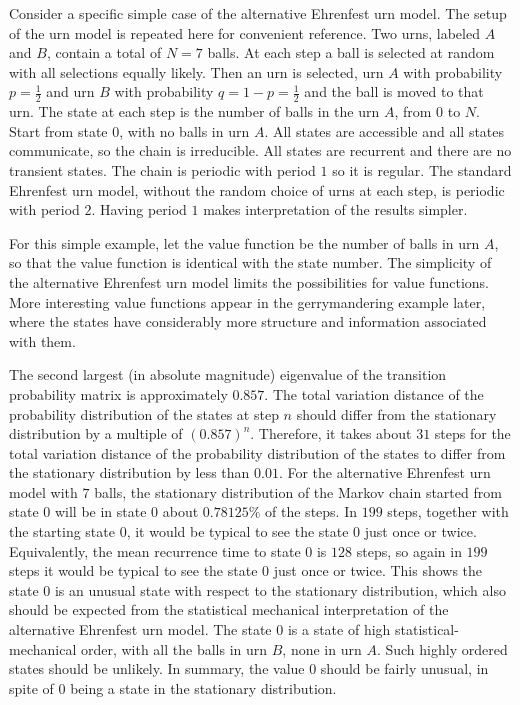 \documentclass[12pt]{article}
\begin{document}
\begin{example}
\begin{example}
    Consider a specific simple case of the alternative Ehrenfest urn
    model.%
    The setup of the urn model is repeated here for convenient reference.
    Two urns, labeled \( A \) and \( B \), contain a total of \( N = 7 \)
    balls.  At each step a ball is selected at random with all
    selections equally likely.  Then an urn is selected, urn \( A \)
    with probability \( p = \frac{1}{2} \) and urn \( B \) with
    probability \( q = 1-p = \frac {1}{2} \) and the ball is moved to
    that urn.  The state at each step is the number of balls in the urn \(
    A \), from \( 0 \) to \( N \).  Start from state \( 0 \), with no
    balls in urn \( A \).  All states are accessible and all states
    communicate, so the chain is irreducible.  All states are recurrent
    and there are no transient states.  The chain is periodic with
    period \( 1 \) so it is regular.  The standard Ehrenfest urn model,
    without the random choice of urns at each step, is periodic with
    period \( 2 \).  Having period \( 1 \) makes interpretation of the
    results simpler.

    For this simple example, let the value function be the number of
    balls in urn \( A \), so that the value function is identical with
    the state number.  The simplicity of the alternative Ehrenfest urn
    model limits the possibilities for value functions.  More
    interesting value functions appear in the gerrymandering example
    later, where the states have considerably more structure and
    information associated with them.

    The second largest (in absolute magnitude) eigenvalue of the
    transition probability matrix is approximately \( 0.857 \).  The
    total variation distance of the probability distribution of the
    states at step \( n \) should differ from the stationary
    distribution by a multiple of \( (0.857)^n \).  Therefore, it takes
    about \( 31 \) steps for the total variation distance of the
    probability distribution of the states to differ from the stationary
    distribution by less than \( 0.01 \).  For the alternative Ehrenfest
    urn model with \( 7 \) balls, the stationary distribution of the
    Markov chain started from state \( 0 \) will be in state \( 0 \)
    about \( 0.78125\% \) of the steps.  In \( 199 \) steps, together
    with the starting state \( 0 \), it would be typical to see the
    state \( 0 \) just once or twice.  Equivalently, the mean recurrence
    time to state \( 0 \) is \( 128 \) steps, so again in \( 199 \)
    steps it would be typical to see the state \( 0 \) just once or
    twice.  This shows the state \( 0 \) is an unusual state with
    respect to the stationary distribution, which also should be
    expected from the statistical mechanical interpretation of the
    alternative Ehrenfest urn model.  The state \( 0 \) is a state of
    high statistical-mechanical order, with all the balls in urn \( B \),
    none in urn \( A \).  Such highly ordered states should be unlikely.
    In summary, the value \( 0 \) should be fairly unusual, in spite of \(
    0 \) being a state in the stationary distribution.


\end{example}
\end{example}
\end{document}
